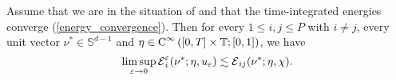 \begin{lemma}
	\label{approximate_tilt_excess_estimated_in_limit_by_tilt_excess}
	Assume that we are in the situation of 
	 and that the time-integrated 
	energies converge (\ref{energy_convergence}). Then for every $ 1 \leq i , j 
	\leq P $ with $ i \neq j $, every unit vector $ \nu^{ \ast } \in \mathbb{ S 
	}^{ d - 1 } $ and 
	$ \eta \in \operatorname{C}^{ \infty } \left( [ 0 , T ] \times \operatorname{\mathbb{T}} ; [ 0 ,1 ] 
	\right) $, we have
	\begin{equation*}
		\limsup_{ \varepsilon \to 0 }
			\tilt_excess_{ i }^{ \varepsilon } ( \nu^{ \ast } ; \eta , u_{ 
			\varepsilon } ) 
			\lesssim
			\tilt_excess_{ i j } ( \nu^{ \ast } ; \eta , \chi ).
	\end{equation*}
\end{lemma}

